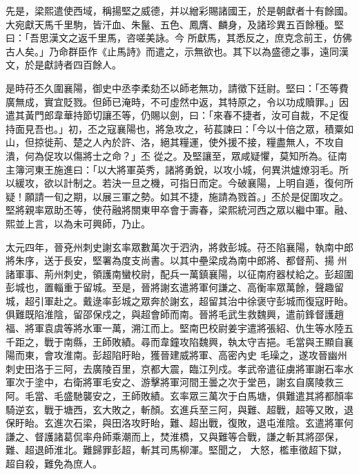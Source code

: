 \begin{pinyinscope}
 先是，梁熙遣使西域，稱揚堅之威德，并以繒彩賜諸國王，於是朝獻者十有餘國。大宛獻天馬千里駒，皆汗血、朱鬣、五色、鳳膺、麟身，及諸珍異五百餘種。堅曰：「吾思漢文之返千里馬，咨嗟美詠。今
 所獻馬，其悉反之，庶克念前王，仿佛古人矣。」乃命群臣作《止馬詩》而遣之，示無欲也。其下以為盛德之事，遠同漢文，於是獻詩者四百餘人。



 是時苻丕久圍襄陽，御史中丞李柔劾丕以師老無功，請徵下廷尉。堅曰：「丕等費廣無成，實宜貶戮。但師已淹時，不可虛然中返，其特原之，令以功成贖罪。」因遣其黃門郎韋華持節切讓丕等，仍賜以劍，曰：「來春不捷者，汝可自裁，不足復持面見吾也。」初，丕之寇襄陽也，將急攻之，茍萇諫曰：「今以十倍之眾，積粟如山，但掠徙荊、楚之人內於許、洛，絕其糧運，使外援不接，糧盡無人，不攻自潰，何為促攻以傷將士之命？」丕
 從之。及堅讓至，眾咸疑懼，莫知所為。征南主簿河東王施進曰：「以大將軍英秀，諸將勇銳，以攻小城，何異洪爐燎羽毛。所以緩攻，欲以計制之。若決一旦之機，可指日而定。今破襄陽，上明自遁，復何所疑！願請一旬之期，以展三軍之勢。如其不捷，施請為戮首。」丕於是促圍攻之。堅將親率眾助丕等，使苻融將關東甲卒會于壽春，梁熙統河西之眾以繼中軍。融、熙並上言，以為未可興師，乃止。



 太元四年，晉兗州刺史謝玄率眾數萬次于泗汭，將救彭城。苻丕陷襄陽，執南中郎將朱序，送于長安，堅署為度支尚書。以其中壘梁成為南中郎將、都督荊、揚
 州諸軍事、荊州刺史，領護南蠻校尉，配兵一萬鎮襄陽，以征南府器杖給之。彭超圍彭城也，置輜重于留城。至是，晉將謝玄遣將軍何謙之、高衡率眾萬餘，聲趣留城，超引軍赴之。戴逯率彭城之眾奔於謝玄，超留其治中徐褒守彭城而復寇盱眙。俱難既陷淮陰，留邵保戍之，與超會師而南。晉將毛武生救魏興，遣前鋒督護趙福、將軍袁虞等將水軍一萬，溯江而上。堅南巴校尉姜宇遣將張紹、仇生等水陸五千距之，戰于南縣，王師敗績。尋而韋鐘攻陷魏興，執太守吉挹。毛當與王顯自襄陽而東，會攻淮南。彭超陷盱眙，獲晉建威將軍、高密內史
 毛璪之，遂攻晉幽州刺史田洛于三阿，去廣陵百里，京都大震，臨江列戍。孝武帝遣征虜將軍謝石率水軍次于塗中，右衛將軍毛安之、游擊將軍河間王曇之次于堂邑，謝玄自廣陵救三阿。毛當、毛盛馳襲安之，王師敗績。玄率眾三萬次于白馬塘，俱難遣其將都顏率騎逆玄，戰于塘西，玄大敗之，斬顏。玄進兵至三阿，與難、超戰，超等又敗，退保盱眙。玄進次石梁，與田洛攻盱眙，難、超出戰，復敗，退屯淮陰。玄遣將軍何謙之、督護諸葛侃率舟師乘潮而上，焚淮橋，又與難等合戰，謙之斬其將邵保，難、超退師淮北。難歸罪彭超，斬其司馬柳渾。堅聞之，
 大怒，檻車徵超下獄，超自殺，難免為庶人。




\end{pinyinscope}
